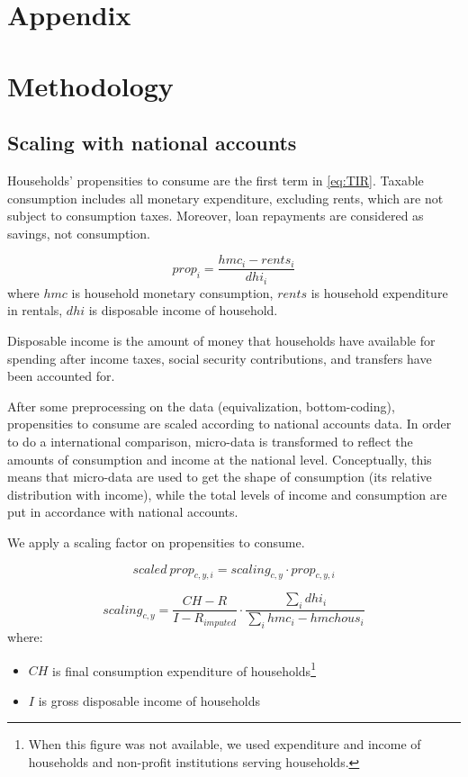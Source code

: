 \section*{\LARGE Appendix}
\renewcommand{\thefigure}{\thesubsection.\alph{figure}}

\section{Methodology}


\subsection{Scaling with national accounts}
\label{aux:scaling}

Households' propensities to consume are the first term in \cref{eq:TIR}. Taxable consumption includes all monetary expenditure, excluding rents, which are not subject to consumption taxes. Moreover, loan repayments are considered as savings, not consumption.

\[ prop_i = \frac{hmc_i-rents_i}{dhi_i} \]
where $hmc$ is household monetary consumption, $rents$ is household expenditure in rentals, $dhi$ is disposable income of household.

Disposable income is the amount of money that households have available for spending after income taxes, social security contributions, and transfers have been accounted for.

After some preprocessing on the data (equivalization, bottom-coding), propensities to consume are scaled according to national accounts data. In order to do a international comparison, micro-data is transformed to reflect the amounts of consumption and income at the national level. Conceptually, this means that micro-data are used to get the shape of consumption (its relative distribution with income), while the total levels of income and consumption are put in accordance with national accounts.

We apply a scaling factor on propensities to consume.

\[ scaled\ prop_{c,y,i} = scaling_{c,y} \cdot prop_{c,y,i} \]

\[ scaling_{c,y} = \frac{CH-R}{I-R_{imputed}} \cdot \frac{\sum_i dhi_i}{\sum_i hmc_i-hmchous_i } \]
where:
\begin{itemize}
\item $CH$ is final consumption expenditure of households\footnote{When this figure was not available, we used expenditure and income of households and non-profit institutions serving households.}
\item $I$ is gross disposable income of households
\end{itemize}

